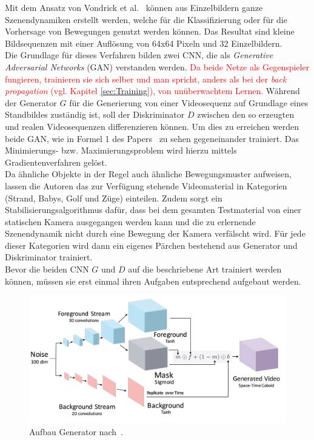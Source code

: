 \documentclass[times, 11pt,twocolumn]{article}
\begin{document}
 \label{sec:Vondrick}
Mit dem Ansatz von Vondrick et al.~\cite{VondrickPT16} können aus Einzelbildern ganze Szenendynamiken erstellt werden, welche für die Klassifizierung oder für die Vorhersage von Bewegungen genutzt werden können. Das Resultat sind kleine Bildsequenzen mit einer Auflösung von 64x64 Pixeln und 32 Einzelbildern. \\
Die Grundlage für dieses Verfahren bilden zwei CNN, die als \textit{Generative Adversarial Networks} (GAN) \cite{NIPS2014_5423} verstanden werden. \textcolor{red}{Da beide Netze als Gegenspieler fungieren, trainieren sie sich selber und man spricht, anders als bei der \textit{back propagation} (vgl. Kapitel \ref{sec:Training}), von unüberwachtem Lernen. }Während der Generator $G$ für die Generierung von einer Videosequenz auf Grundlage eines Standbildes zuständig ist, soll der Diskriminator $D$ zwischen den so erzeugten und realen Videosequenzen differenzieren können. Um dies zu erreichen werden beide GAN, wie in Formel 1 des Papers~\cite{VondrickPT16} zu sehen gegeneinander trainiert. Das Minimierungs- bzw. Maximierungsproblem wird hierzu mittels Gradientenverfahren gelöst. \\
Da ähnliche Objekte in der Regel auch ähnliche Bewegungsmuster aufweisen, lassen die Autoren das zur Verfügung stehende Videomaterial in Kategorien (Strand, Babys, Golf und Züge) einteilen. Zudem sorgt ein Stabilisierungsalgorithmus dafür, dass bei dem gesamten Testmaterial von einer statischen Kamera ausgegangen werden kann und die zu erlernende Szenendynamik nicht durch eine Bewegung der Kamera verfälscht wird. Für jede dieser Kategorien wird dann ein eigenes Pärchen bestehend aus Generator und Diskriminator trainiert. \\
Bevor die beiden CNN $G$ und $D$ auf die beschriebene Art trainiert werden können, müssen sie erst einmal ihren Aufgaben entsprechend aufgebaut werden. \\
\begin{figure}
	\flushleft
	\includegraphics[width=\columnwidth]{Bilder/generator2.jpg}
	\caption{Aufbau Generator nach~\cite{VondrickPT16}.}
	\label{fig:generator}
\end{figure}
\end{document}
